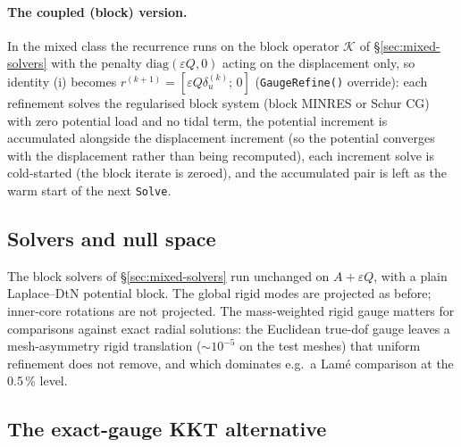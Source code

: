 \documentclass[11pt]{article}
\numberwithin{equation}{section}
\theoremstyle{remark}
\newcommand{\eps}{\varepsilon}
\newcommand{\code}[1]{\texttt{#1}}
\begin{document}
\paragraph{The coupled (block) version.} In the mixed class the recurrence
runs on the block operator $\mathcal{K}$ of \S\ref{sec:mixed-solvers} with
the penalty $\mathrm{diag}(\eps Q, 0)$ acting on the displacement only, so
identity (i) becomes $r^{(k+1)} = [\eps Q\delta_u^{(k)};\,0]$
(\code{GaugeRefine()} override): each refinement solves the regularised
block system (block MINRES or Schur CG) with zero potential load and no
tidal term, the potential increment is accumulated alongside the
displacement increment (so the potential converges with the displacement
rather than being recomputed), each increment solve is cold-started (the
block iterate is zeroed), and the accumulated pair is left as the warm
start of the next \code{Solve}.

\subsection{Solvers and null space}

The block solvers of \S\ref{sec:mixed-solvers} run unchanged on $A+\eps Q$,
with a plain Laplace--DtN potential block. The global rigid modes are
projected as before; inner-core rotations are not projected. The
mass-weighted rigid gauge matters for comparisons against exact radial
solutions: the Euclidean true-dof gauge leaves a mesh-asymmetry rigid
translation ($\sim10^{-5}$ on the test meshes) that uniform refinement does
not remove, and which dominates e.g.\ a Lam\'e comparison at the 0.5\,\%
level.

\subsection{The exact-gauge KKT alternative}
\label{sec:gaugekkt}
\end{document}

